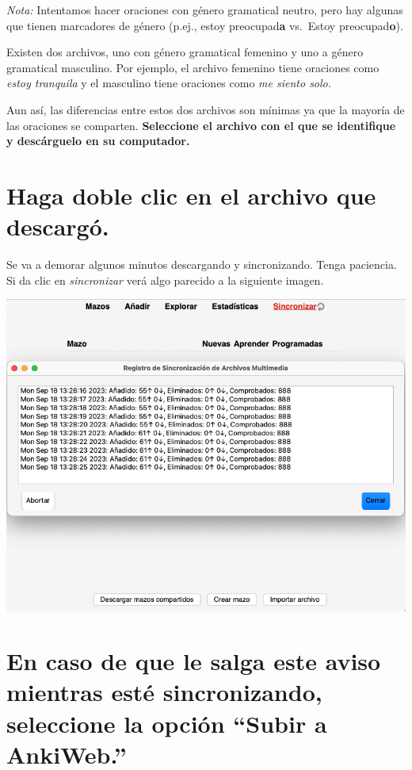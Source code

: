 \documentclass[
]{book}
\begin{document}
\emph{Nota:} Intentamos hacer oraciones con género gramatical neutro, pero hay algunas que tienen marcadores de género (p.ej., estoy preocupad\textbf{a} vs.~Estoy preocupad\textbf{o}).

Existen dos archivos, uno con género gramatical femenino y uno a género gramatical masculino. Por ejemplo, el archivo femenino tiene oraciones como \emph{estoy tranquila} y el masculino tiene oraciones como \emph{me siento solo.}

Aun así, las diferencias entre estos dos archivos son mínimas ya que la mayoría de las oraciones se comparten. \textbf{Seleccione el archivo con el que se identifique y descárguelo en su computador.}

\hypertarget{haga-doble-clic-en-el-archivo-que-descarguxf3.}{%
\section{Haga doble clic en el archivo que descargó.}\label{haga-doble-clic-en-el-archivo-que-descarguxf3.}}

Se va a demorar algunos minutos descargando y sincronizando. Tenga paciencia. Si da clic en \emph{sincronizar} verá algo parecido a la siguiente imagen.

\includegraphics[width=1\linewidth]{images/reposit_sp/sincronizar}

\hypertarget{en-caso-de-que-le-salga-este-aviso-mientras-estuxe9-sincronizando-seleccione-la-opciuxf3n-subir-a-ankiweb.}{%
\section*{En caso de que le salga este aviso mientras esté sincronizando, seleccione la opción ``Subir a AnkiWeb.''}\label{en-caso-de-que-le-salga-este-aviso-mientras-estuxe9-sincronizando-seleccione-la-opciuxf3n-subir-a-ankiweb.}}
\end{document}

